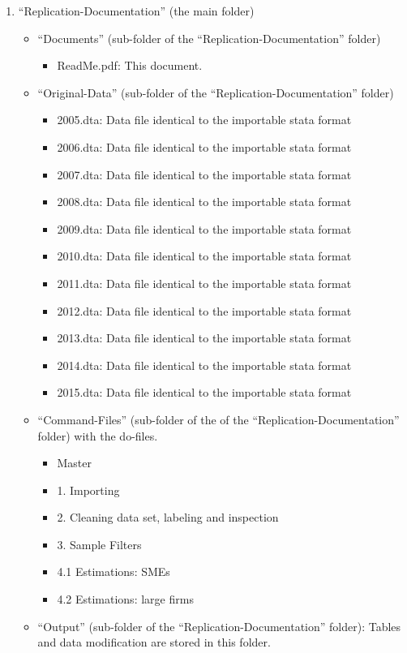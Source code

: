 \documentclass[12pt,a4paper]{article}
\begin{document}
\begin{enumerate}
	\item “Replication-Documentation” (the main folder)
	\begin{itemize}
		\item “Documents” (sub-folder of the “Replication-Documentation” folder)
		\begin{itemize}
		\item ReadMe.pdf: This document.
			\end{itemize}
		\item “Original-Data” (sub-folder of the “Replication-Documentation” folder)
		\begin{itemize}
			\item 2005.dta:  Data file identical to the importable stata format
			\item 2006.dta:  Data file identical to the importable stata format
			\item 2007.dta:  Data file identical to the importable stata format
			\item 2008.dta:  Data file identical to the importable stata format
			\item 2009.dta:  Data file identical to the importable stata format
			\item 2010.dta:  Data file identical to the importable stata format
			\item 2011.dta:  Data file identical to the importable stata format
			\item 2012.dta:  Data file identical to the importable stata format
			\item 2013.dta:  Data file identical to the importable stata format
			\item 2014.dta:  Data file identical to the importable stata format
			\item 2015.dta:  Data file identical to the importable stata format
		\end{itemize}
	\item “Command-Files” (sub-folder of the of the “Replication-Documentation” folder) with the do-files. 
	\begin{itemize}
		\item Master
		\item 1. Importing
		\item 2. Cleaning data set, labeling and inspection
		\item 3. Sample Filters
		\item 4.1 Estimations: SMEs 
		\item 4.2 Estimations: large firms 
	\end{itemize}
\item “Output” (sub-folder of the “Replication-Documentation” folder): Tables and data modification are stored in this folder. 
	\end{itemize}
\end{enumerate}
\end{document}
